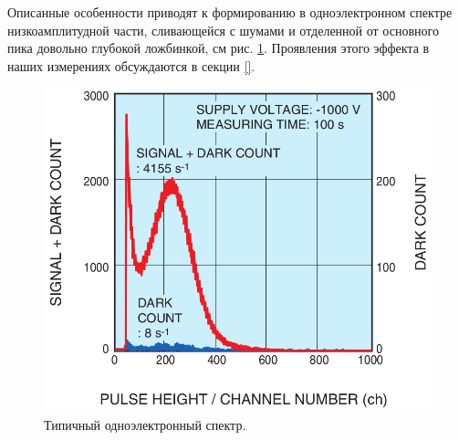 Описанные особенности приводят к формированию в одноэлектронном спектре низкоамплитудной части, сливающейся с шумами и отделенной от основного пика довольно глубокой ложбинкой, см рис. \ref{fig:SPEspectrum}. Проявления этого эффекта в наших измерениях обсуждаются в секции \ref{}.

\begin{figure}
\includegraphics[width=1.0\textwidth]{pictures/3_Typical_spectrum_from_H12700.png}
\caption{Типичный одноэлектронный спектр.}
\label{fig:SPEspectrum}
\end{figure}
